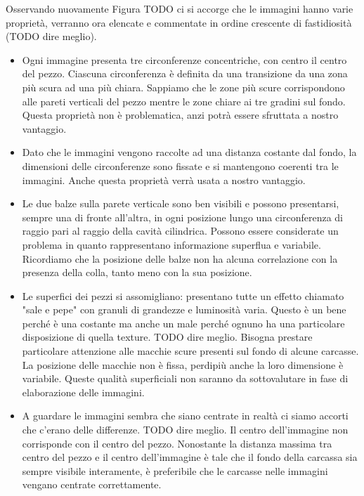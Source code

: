 Osservando nuovamente Figura TODO ci si accorge che le immagini hanno varie proprietà, verranno ora elencate e commentate in ordine crescente di fastidiosità (TODO dire meglio).
\begin{itemize}

  \item Ogni immagine presenta tre circonferenze concentriche, con centro il centro del pezzo.
    Ciascuna circonferenza è definita da una transizione da una zona più scura ad una più chiara.
    Sappiamo che le zone più scure corrispondono alle pareti verticali del pezzo mentre le zone chiare ai tre gradini sul fondo.
    Questa proprietà non è problematica, anzi potrà essere sfruttata a nostro vantaggio.

  \item Dato che le immagini vengono raccolte ad una distanza costante dal fondo, la dimensioni delle circonferenze sono fissate e si mantengono coerenti tra le immagini. Anche questa proprietà verrà usata a nostro vantaggio.

  \item Le due balze sulla parete verticale sono ben visibili e possono presentarsi, sempre una di fronte all'altra, in ogni posizione lungo una circonferenza di raggio pari al raggio della cavità cilindrica.
    Possono essere considerate un problema in quanto rappresentano informazione superflua e variabile.
    Ricordiamo che la posizione delle balze non ha alcuna correlazione con la presenza della colla, tanto meno con la sua posizione.

  \item Le superfici dei pezzi si assomigliano: presentano tutte un effetto chiamato "sale e pepe" con granuli di grandezze e luminosità varia.
    Questo è un bene perché è una costante ma anche un male perché ognuno ha una particolare disposizione di quella texture. TODO dire meglio.
    Bisogna prestare particolare attenzione alle macchie scure presenti sul fondo di alcune carcasse.
    La posizione delle macchie non è fissa, perdipiù anche la loro dimensione è variabile.
    Queste qualità superficiali non saranno da sottovalutare in fase di elaborazione delle immagini.

  \item A guardare le immagini sembra che siano centrate in realtà ci siamo accorti che c'erano delle differenze. TODO dire meglio.
    Il centro dell'immagine non corrisponde con il centro del pezzo.
    Nonostante la distanza massima tra centro del pezzo e il centro dell'immagine è tale che il fondo della carcassa sia sempre visibile interamente, è preferibile che le carcasse nelle immagini vengano centrate correttamente.
  

\end{itemize}

